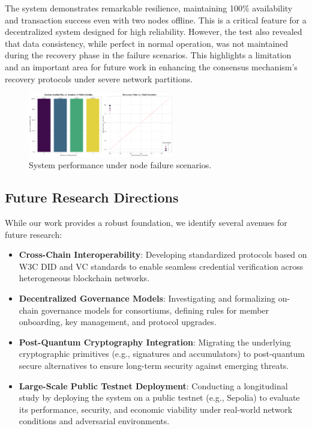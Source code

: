\documentclass[lettersize,journal]{IEEEtran}
\begin{document}
\begin{itemize}
The system demonstrates remarkable resilience, maintaining 100\% availability and transaction success even with two nodes offline. This is a critical feature for a decentralized system designed for high reliability. However, the test also revealed that data consistency, while perfect in normal operation, was not maintained during the recovery phase in the failure scenarios. This highlights a limitation and an important area for future work in enhancing the consensus mechanism's recovery protocols under severe network partitions.

\begin{figure}[!t]
\centering
\includegraphics[width=2.5in]{figures/fig6_fault_tolerance.png}
\caption{System performance under node failure scenarios.}
\label{fig:fault_tolerance}
\end{figure}

\subsection{Future Research Directions}
While our work provides a robust foundation, we identify several avenues for future research:
\begin{itemize}
    \item \textbf{Cross-Chain Interoperability}: Developing standardized protocols based on W3C DID and VC standards to enable seamless credential verification across heterogeneous blockchain networks.

    \item \textbf{Decentralized Governance Models}: Investigating and formalizing on-chain governance models for consortiums, defining rules for member onboarding, key management, and protocol upgrades.

    \item \textbf{Post-Quantum Cryptography Integration}: Migrating the underlying cryptographic primitives (e.g., signatures and accumulators) to post-quantum secure alternatives to ensure long-term security against emerging threats.
    
    \item \textbf{Large-Scale Public Testnet Deployment}: Conducting a longitudinal study by deploying the system on a public testnet (e.g., Sepolia) to evaluate its performance, security, and economic viability under real-world network conditions and adversarial environments.
\end{itemize}


\end{itemize}
\end{document}

